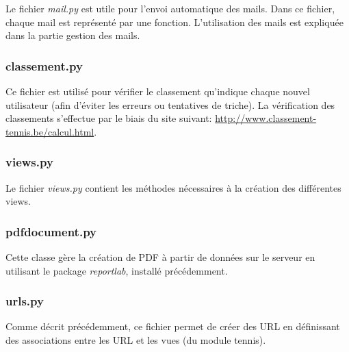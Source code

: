 Le fichier \textit{mail.py} est utile pour l'envoi automatique des mails. Dans ce fichier, chaque mail est représenté par une fonction. L'utilisation des mails est expliquée dans la partie gestion des mails.

\subsubsection{classement.py} 

Ce fichier est utilisé pour vérifier le classement qu'indique chaque nouvel utilisateur (afin d'éviter les erreurs ou tentatives de triche). La vérification des classements s'effectue par le biais du site suivant: \url{http://www.classement-tennis.be/calcul.html}.

\subsubsection{views.py}

Le fichier \textit{views.py} contient les méthodes nécessaires à la création des différentes views.

\subsubsection{pdfdocument.py}

Cette classe gère la création de PDF à partir de données sur le serveur en utilisant le package \textit{reportlab}, installé précédemment.

\subsubsection{urls.py}

Comme décrit précédemment, ce fichier permet de créer des URL en définissant des associations entre les URL et les vues (du module tennis).

